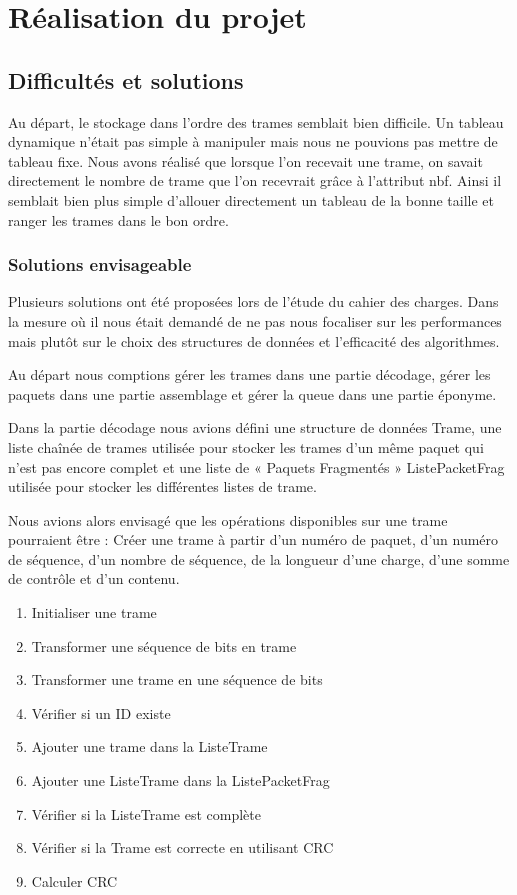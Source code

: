 \documentclass[a4paper,11pt]{article}
\begin{document}
\section{Réalisation du projet}

\subsection{Difficultés et solutions}

Au départ, le stockage dans l'ordre des trames semblait bien difficile. Un tableau dynamique n'était pas simple à manipuler mais nous ne pouvions pas mettre de tableau fixe. Nous avons réalisé que lorsque l'on recevait une trame, on savait directement le nombre de trame que l'on recevrait grâce à l’attribut nbf. Ainsi il semblait bien plus simple d'allouer directement un tableau de la bonne taille et ranger les trames dans le bon ordre.

\subsubsection{Solutions envisageable}

Plusieurs solutions ont été proposées lors de l'étude du cahier des charges. Dans la mesure où il nous était demandé de ne pas nous focaliser sur les performances mais plutôt sur le choix des structures de données et l'efficacité des algorithmes.

Au départ nous comptions gérer les trames dans une partie décodage, gérer les paquets dans une partie assemblage et gérer la queue dans une partie éponyme.
 
Dans la partie décodage nous avions défini une structure de données Trame, une liste chaînée de trames utilisée pour stocker les trames d'un même paquet qui n'est pas encore complet et une liste de « Paquets Fragmentés » ListePacketFrag utilisée pour stocker les différentes listes de trame.


Nous avions alors envisagé que les opérations disponibles sur une trame pourraient être :
Créer une trame à partir d'un numéro de paquet, d'un numéro de séquence, d'un nombre de séquence, de la longueur d'une charge, d'une somme de contrôle et d'un contenu.
\begin{enumerate}
 \item Initialiser une trame
 \item Transformer une séquence de bits en trame
 \item Transformer une trame en une séquence de bits
 \item Vérifier si un ID existe
 \item Ajouter une trame dans la ListeTrame
 \item Ajouter une ListeTrame dans la ListePacketFrag
 \item Vérifier si la ListeTrame est complète
 \item Vérifier si la Trame est correcte en utilisant CRC
 \item Calculer CRC
\end{enumerate}
\end{document}
